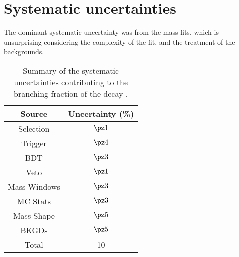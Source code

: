 \section{Systematic uncertainties}
\label{sec:dsphi:syst}

The dominant systematic uncertainty was from the mass fits, which is unsurprising considering the
complexity of the fit, and the treatment of the backgrounds.





\begin{table}
  \caption{\small
    Summary of the systematic uncertainties contributing to the branching fraction of the decay
    \btodsphi.
  }
  \label{}
  \begin{center}
    \begin{tabular}{cc}
      \toprule
      Source & Uncertainty (\%) \\
      \midrule
      Selection & $\pz1$ \\
      Trigger & $\pz4$ \\
      BDT & $\pz3$ \\
      Veto & $\pz1$ \\
      Mass Windows & $\pz3$ \\
      MC Stats & $\pz3$ \\
      Mass Shape & $\pz5$ \\
      BKGDs & $\pz5$ \\
      Total & 10 \\
      \bottomrule
    \end{tabular}
  \end{center}
\end{table}


